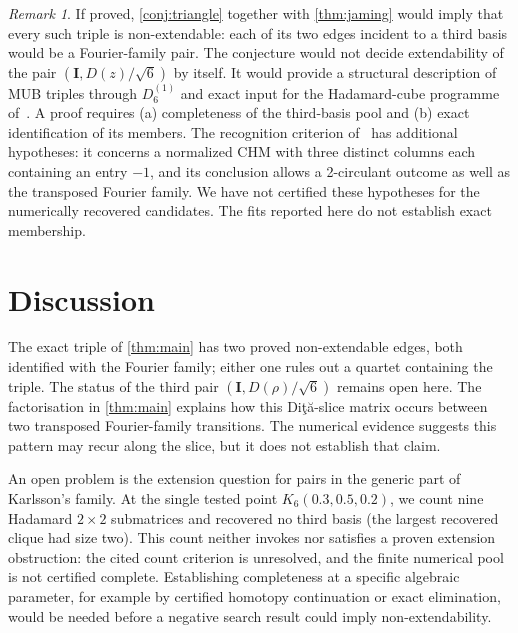 \documentclass[11pt]{article}
\numberwithin{equation}{section}
\theoremstyle{plain}
\theoremstyle{definition}
\theoremstyle{remark}
\newtheorem{remark}[theorem]{Remark}
\newcommand{\I}{\mathbf{I}}
\newcommand{\Dita}{\texorpdfstring{Di\c{t}\u{a}}{Dita}}
\begin{document}
\begin{remark}
If proved, \cref{conj:triangle} together with \cref{thm:jaming} would imply that every such triple is non-extendable: each of its two edges incident to a third basis would be a Fourier-family pair. The conjecture would not decide extendability of the pair $(\I,D(z)/\sqrt6)$ by itself. It would provide a structural description of MUB triples through $D_6^{(1)}$ and exact input for the Hadamard-cube programme of~\cite{Matolcsi2025}. A proof requires (a) completeness of the third-basis pool and (b) exact identification of its members. The recognition criterion of~\cite{MatszangoszSzollosi2024} has additional hypotheses: it concerns a normalized CHM with three distinct columns each containing an entry $-1$, and its conclusion allows a 2-circulant outcome as well as the transposed Fourier family. We have not certified these hypotheses for the numerically recovered candidates. The fits reported here do not establish exact membership.
\end{remark}

\section{Discussion}\label{sec:discussion}

The exact triple of \cref{thm:main} has two proved non-extendable edges, both identified with the Fourier family; either one rules out a quartet containing the triple. The status of the third pair $(\I,D(\rho)/\sqrt6)$ remains open here. The factorisation in \cref{thm:main} explains how this \Dita{}-slice matrix occurs between two transposed Fourier-family transitions. The numerical evidence suggests this pattern may recur along the slice, but it does not establish that claim.

An open problem is the extension question for pairs in the generic part of Karlsson's family. At the single tested point $K_6(0.3,0.5,0.2)$, we count nine Hadamard $2\times2$ submatrices and recovered no third basis (the largest recovered clique had size two). This count neither invokes nor satisfies a proven extension obstruction: the cited count criterion is unresolved, and the finite numerical pool is not certified complete. Establishing completeness at a specific algebraic parameter, for example by certified homotopy continuation or exact elimination, would be needed before a negative search result could imply non-extendability.
\end{document}
